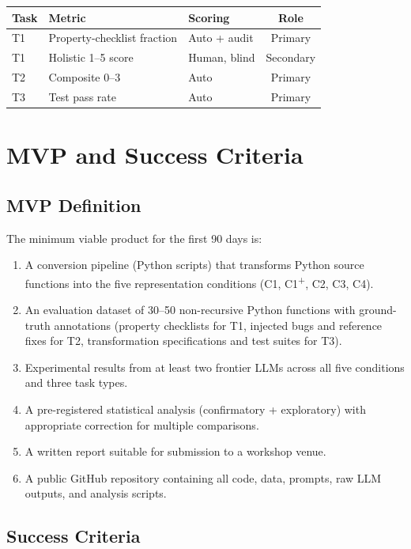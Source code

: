 \documentclass[11pt]{article}
\begin{document}
\begin{longtable}{@{}lllc@{}}
  \toprule
  \textbf{Task} & \textbf{Metric} & \textbf{Scoring} &
    \textbf{Role} \\
  \midrule
  \endfirsthead
  T1 & Property-checklist fraction & Auto + audit & Primary \\
  T1 & Holistic 1--5 score & Human, blind & Secondary \\
  T2 & Composite 0--3 & Auto & Primary \\
  T3 & Test pass rate & Auto & Primary \\
  \bottomrule
\end{longtable}


\section{MVP and Success Criteria}
\label{sec:mvp}

\subsection*{MVP Definition}

The minimum viable product for the first 90 days is:
\begin{enumerate}
  \item A conversion pipeline (Python scripts) that transforms Python
        source functions into the five representation conditions
        (C1, C1\textsuperscript{+}, C2, C3, C4).
  \item An evaluation dataset of 30--50 non-recursive Python functions
        with ground-truth annotations (property checklists for T1,
        injected bugs and reference fixes for T2, transformation
        specifications and test suites for T3).
  \item Experimental results from at least two frontier LLMs across all
        five conditions and three task types.
  \item A pre-registered statistical analysis (confirmatory +
        exploratory) with appropriate correction for multiple
        comparisons.
  \item A written report suitable for submission to a workshop venue.
  \item A public GitHub repository containing all code, data, prompts,
        raw LLM outputs, and analysis scripts.
\end{enumerate}

\subsection*{Success Criteria}
\end{document}

